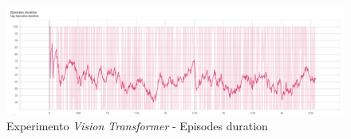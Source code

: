 \begin{figure}[H]
	\centering
	\includegraphics[width=1\textwidth]{figuras/experiments/vision transformers/episodes_duration.png}
	\caption[Experimento \textit{Vision Transformer} - Episodes duration]{Experimento \textit{Vision Transformer} - Episodes duration}
	\label{fig-experimento-vision-transformer-1-episodes-duration}
\end{figure}